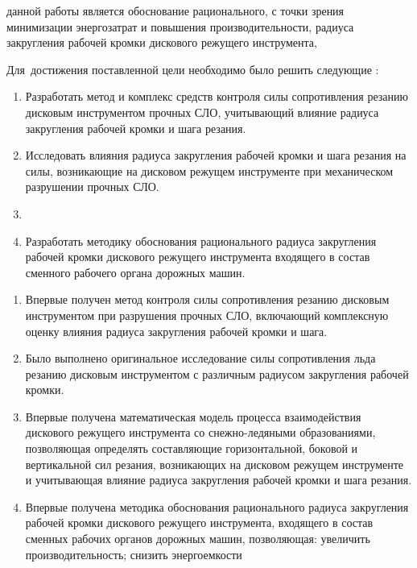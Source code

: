 
{\aim} данной работы является обоснование рационального, с точки зрения минимизации энергозатрат и повышения производительности, радиуса закругления рабочей кромки дискового режущего инструмента,  

Для~достижения поставленной цели необходимо было решить следующие {\tasks}:
\begin{enumerate}
  \item Разработать метод и комплекс средств контроля силы сопротивления резанию дисковым инструментом прочных СЛО, учитывающий влияние радиуса закругления рабочей кромки и шага резания.
  \item Исследовать влияния радиуса закругления рабочей кромки и шага резания на силы, возникающие на дисковом режущем инструменте при механическом разрушении прочных СЛО.
  \item {}
  \item Разработать методику обоснования рационального радиуса закругления рабочей кромки дискового режущего инструмента входящего в состав сменного рабочего органа дорожных машин.
\end{enumerate}

{\novelty}
\begin{enumerate}
  \item Впервые получен метод контроля силы сопротивления резанию дисковым инструментом при разрушения прочных СЛО, включающий комплексную оценку влияния радиуса закругления рабочей кромки и шага.
  \item Было выполнено оригинальное исследование силы сопротивления льда резанию дисковым инструментом с различным радиусом закругления рабочей кромки.
  \item Впервые получена математическая модель процесса взаимодействия дискового режущего инструмента со снежно-ледяными образованиями, позволяющая определять составляющие горизонтальной, боковой и вертикальной сил резания, возникающих на дисковом режущем инструменте и учитывающая влияние радиуса закругления рабочей кромки и шага резания.
  \item Впервые получена методика обоснования рационального радиуса закругления рабочей кромки дискового режущего инструмента, входящего в состав сменных рабочих органов дорожных машин, позволяющая: увеличить производительность; снизить энергоемкости 
\end{enumerate}

